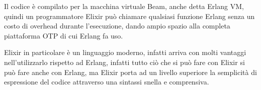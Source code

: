 Il codice è compilato per la macchina virtuale Beam,
anche detta Erlang VM, quindi un programmatore Elixir 
può chiamare qualsiasi funzione Erlang senza 
un costo di overhead durante l'esecuzione,
dando ampio spazio alla completa piattaforma OTP di
cui Erlang fa uso.\cite{OpenTele88:online}

Elixir in particolare è un linguaggio moderno, infatti
arriva con molti vantaggi nell'utilizzarlo rispetto ad
Erlang, infatti tutto ciò che si può fare con Elixir
si può fare anche con Erlang, ma Elixir porta ad un
livello superiore la semplicità di espressione
del codice attraverso una sintassi snella e comprensiva.



